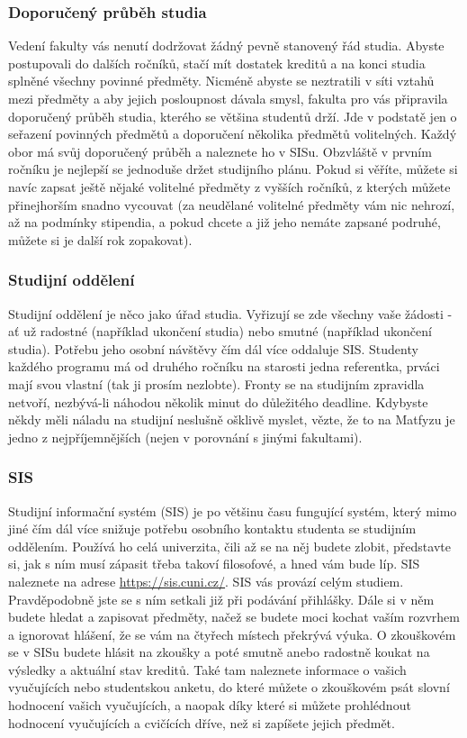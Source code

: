 \subsubsection{Doporučený průběh studia}
Vedení fakulty vás nenutí dodržovat žádný pevně stanovený řád studia. Abyste
postupovali do dalších ročníků, stačí mít dostatek kreditů a na konci studia
splněné všechny povinné předměty. Nicméně abyste se neztratili v síti vztahů
mezi předměty a aby jejich posloupnost dávala smysl, fakulta pro vás připravila
doporučený průběh studia, kterého se většina studentů drží. Jde v podstatě jen o
seřazení povinných předmětů a doporučení několika předmětů volitelných. Každý
obor má svůj doporučený průběh a naleznete ho v SISu.
Obzvláště v prvním ročníku je nejlepší se jednoduše držet studijního plánu.
Pokud si věříte, můžete si navíc zapsat ještě nějaké volitelné předměty z
vyšších ročníků, z kterých můžete přinejhorším snadno vycouvat (za neudělané
volitelné předměty vám nic nehrozí, až na podmínky stipendia, a pokud chcete a
již jeho nemáte zapsané podruhé, můžete si je další rok zopakovat).


\subsubsection{Studijní oddělení}
Studijní oddělení je něco jako úřad studia. Vyřizují se zde všechny vaše žádosti
- ať už radostné (například ukončení studia) nebo smutné (například ukončení
studia). Potřebu jeho osobní návštěvy čím dál více oddaluje SIS. Studenty
každého programu má od druhého ročníku na starosti jedna referentka, prváci mají
svou vlastní (tak ji prosím nezlobte).
Fronty se na studijním zpravidla netvoří, nezbývá-li náhodou několik minut do
důležitého deadline. Kdybyste někdy měli náladu na studijní neslušně ošklivě
myslet, vězte, že to na Matfyzu je jedno z nejpříjemnějších (nejen v porovnání s
jinými fakultami).


\subsubsection{SIS}
Studijní informační systém (SIS) je po většinu času fungující systém, který mimo
jiné čím dál více snižuje potřebu osobního kontaktu studenta se studijním
oddělením. Používá ho celá univerzita, čili až se na něj budete zlobit,
představte si, jak s ním musí zápasit třeba takoví filosofové, a hned vám bude
líp. SIS naleznete na adrese \url{https://sis.cuni.cz/}.
SIS vás provází celým studiem. Pravděpodobně jste se s ním setkali již při
podávání přihlášky. Dále si v něm budete hledat a zapisovat předměty, načež se
budete moci kochat vaším rozvrhem a ignorovat hlášení, že se vám na čtyřech
místech překrývá výuka. O zkouškovém se v SISu budete hlásit na zkoušky a poté
smutně anebo radostně koukat na výsledky a aktuální stav kreditů. Také tam
naleznete informace o vašich vyučujících nebo studentskou anketu, do které
můžete o zkouškovém psát slovní hodnocení vašich vyučujících, a naopak díky
které si můžete prohlédnout hodnocení vyučujících a cvičících dříve, než si
zapíšete jejich předmět.


